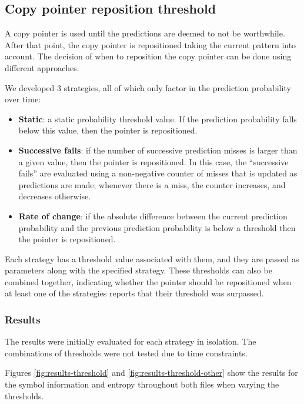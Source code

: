 \documentclass{article}
\begin{document}
\subsection{Copy pointer reposition threshold}

A copy pointer is used until the predictions are deemed to not be worthwhile.
After that point, the copy pointer is repositioned taking the current pattern into account.
The decision of when to reposition the copy pointer can be done using different approaches.

We developed 3 strategies, all of which only factor in the prediction probability over time:
\begin{itemize}
    \item \textbf{Static}: a static probability threshold value. If the prediction probability falls below this value, then the pointer is repositioned.
    \item \textbf{Successive fails}: if the number of successive prediction misses is larger than a given value, then the pointer is repositioned.
    In this case, the ``successive fails'' are evaluated using a non-negative counter of misses that is updated as predictions are made; whenever there is a miss, the counter increases, and decreases otherwise.
    \item \textbf{Rate of change}: if the absolute difference between the current prediction probability and the previous prediction probability is below a threshold then the pointer is repositioned.
\end{itemize}

Each strategy has a threshold value associated with them, and they are passed as parameters along with the specified strategy.
These thresholds can also be combined together, indicating whether the pointer should be repositioned when at least one of the strategies reports that their threshold was surpassed.

\subsubsection{Results}

The results were initially evaluated for each strategy in isolation.
The combinations of thresholds were not tested due to time constraints.

Figures \ref{fig:results-threshold} and \ref{fig:results-threshold-other} show the results for the symbol information and entropy throughout both files when varying the thresholds.
\end{document}
